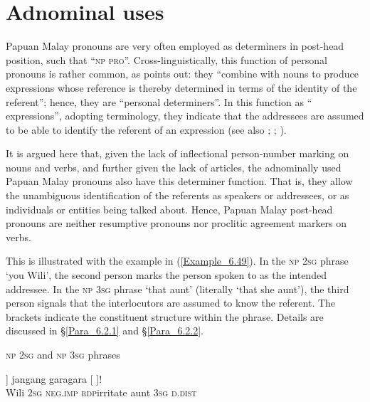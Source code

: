 \section{Adnominal uses}
\label{Para_6.2}
Papuan Malay pronouns are very often employed as determiners in post-head position, such that ``\textsc{np} \textsc{pro}''. Cross-linguistically, this function of personal pronouns is rather common, as \citet[141]{Lyons.1999} points out: they “combine with nouns to produce expressions whose reference is thereby determined in terms of the identity of the referent”; hence, they are “personal determiners”. In this function as “ expressions”, adopting  terminology, they indicate that the addressees are assumed to be able to identify the referent of an expression (see also \citealt[11]{Bhat.2007}; \citealt[26–32]{Lyons.1999}; \citealt[454–455]{Lyons.1977}).



It is argued here that, given the lack of inflectional person-number marking on nouns and verbs, and further given the lack of  articles, the adnominally used Papuan Malay pronouns also have this determiner function. That is, they allow the unambiguous identification of the referents as speakers or addressees, or as individuals or entities being talked about. Hence, Papuan Malay post-head pronouns are neither resumptive pronouns nor proclitic agreement markers on verbs.



This is illustrated with the example in (\ref{Example_6.49}). In the \textsc{np} \textsc{2sg}  phrase  ‘you Wili’, the second person  marks the person spoken to as the intended addressee. In the \textsc{np} \textsc{3sg}  phrase  ‘that aunt’ (literally ‘that she aunt’), the third person  signals that the interlocutors are assumed to know the referent. The brackets indicate the constituent structure within the  phrase. Details are discussed in §\ref{Para_6.2.1} and §\ref{Para_6.2.2}.



\begin{styleExampleTitle}
\textsc{np} \textsc{2sg} and \textsc{np} \textsc{3sg}  phrases
\end{styleExampleTitle}

\ea
\label{Example_6.49}
\gll {[\bluebold{Wili}} {]} {jangang} {gara{\Tilde}gara} {[} {} {]}!\\ %
 Wili  \textsc{2sg}  \textsc{neg.imp}  \textsc{rdp}{\Tilde}irritate  aunt  \textsc{3sg}  \textsc{d.dist}\\

